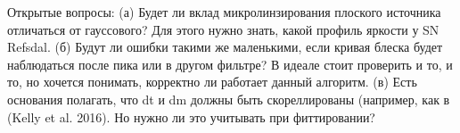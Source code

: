 Открытые вопросы:
(а) Будет ли вклад микролинзирования плоского источника отличаться от гауссового? Для этого нужно знать, какой профиль яркости у SN Refsdal.
(б) Будут ли ошибки такими же маленькими, если кривая блеска будет наблюдаться после пика или в другом фильтре? В идеале стоит проверить и то, и то, но хочется понимать, корректно ли работает данный алгоритм.
(в) Есть основания полагать, что dt и dm должны быть скореллированы (например, как в (Kelly et al. 2016). Но нужно ли это учитывать при фиттировании?
